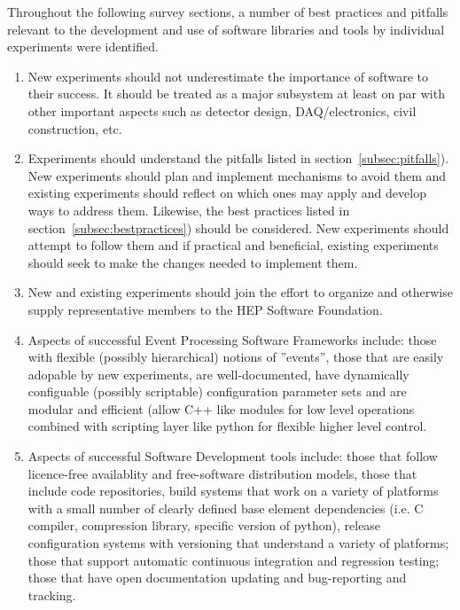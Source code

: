 Throughout the following survey sections, a number of best practices
and pitfalls relevant to the development and use of software libraries
and tools by individual experiments were identified.

\begin{enumerate}

\item New experiments should not underestimate the importance of
  software to their success.  It should be treated as a major
  subsystem at least on par with other important aspects such as
  detector design, DAQ/electronics, civil construction, etc.

\item Experiments should understand the pitfalls listed in
  section~\ref{subsec:pitfalls}).  New experiments should plan and
  implement mechanisms to avoid them and existing experiments should
  reflect on which ones may apply and develop ways to address them.
  Likewise, the best practices listed in
  section~\ref{subsec:bestpractices}) should be considered.  New
  experiments should attempt to follow them and if practical and
  beneficial, existing experiments should seek to make the changes
  needed to implement them.

\item New and existing experiments should join the effort to organize
  and otherwise supply representative members to the HEP Software
  Foundation.

\item Aspects of successful Event Processing Software Frameworks include: 
those with flexible (possibly hierarchical) notions of ''events'', 
those that are easily adopable by new experiments, are well-documented, 
have dynamically configuable (possibly scriptable) configuration 
parameter sets and are modular and efficient (allow C++ like modules 
for low level 
operations combined with scripting layer like python for flexible 
higher level control.

\item Aspects of successful Software Development tools include:
those that follow licence-free availablity and free-software distribution models, those that include code repositories, build systems that work on a variety of platforms with a small number of clearly defined base element dependencies 
(i.e. C compiler, compression library, specific version of python), release 
configuration systems with versioning that understand a variety of 
platforms; those that support automatic continuous integration and 
regression testing; those that have open documentation updating and  
bug-reporting and tracking.


\end{enumerate}

